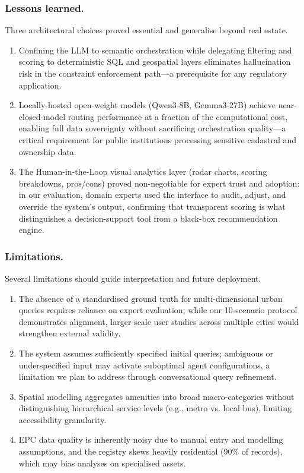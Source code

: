 \documentclass[runningheads,orivec]{llncs}
\begin{document}
\subsubsection{Lessons learned.}
Three architectural choices proved essential and generalise beyond real estate.
\begin{enumerate}[label=(\roman*)]
    \item Confining the LLM to semantic orchestration while delegating filtering and scoring to deterministic SQL and geospatial layers eliminates hallucination risk in the constraint enforcement path—a prerequisite for any regulatory application.
    \item Locally-hosted open-weight models (Qwen3-8B, Gemma3-27B) achieve near-closed-model routing performance at a fraction of the computational cost, enabling full data sovereignty without sacrificing orchestration quality—a critical requirement for public institutions processing sensitive cadastral and ownership data. 
    \item The Human-in-the-Loop visual analytics layer (radar charts, scoring breakdowns, pros/cons) proved non-negotiable for expert trust and adoption: in our evaluation, domain experts used the interface to audit, adjust, and override the system's output, confirming that transparent scoring is what distinguishes a decision-support tool from a black-box recommendation engine.
\end{enumerate}

\subsubsection{Limitations.}
Several limitations should guide interpretation and future deployment.
\begin{enumerate}[label=(\roman*)]
    \item The absence of a standardised ground truth for multi-dimensional urban queries requires reliance on expert evaluation; while our 10-scenario protocol demonstrates alignment, larger-scale user studies across multiple cities would strengthen external validity. 
    \item The system assumes sufficiently specified initial queries; ambiguous or underspecified input may activate suboptimal agent configurations, a limitation we plan to address through conversational query refinement. 
    \item Spatial modelling aggregates amenities into broad macro-categories without distinguishing hierarchical service levels (e.g., metro vs. local bus), limiting accessibility granularity. 
    \item EPC data quality is inherently noisy due to manual entry and modelling assumptions, and the registry skews heavily residential (90\% of records), which may bias analyses on specialised assets.
\end{enumerate}
\end{document}
